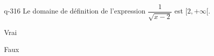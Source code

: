 \begin{truefalse}{q-316}
Le domaine de définition de l'expression $\dfrac{1}{\sqrt{x-2}}$ est $[2,+\infty[$.
\item Vrai
\item* Faux
\end{truefalse}


